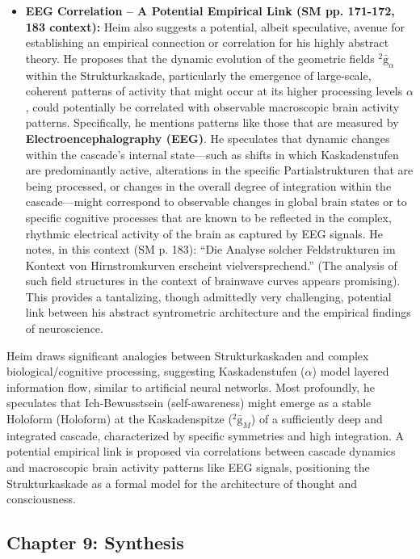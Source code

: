 \documentclass[12pt]{article}
\newcommand{\q}[1]{\enquote{#1}}
\newcommand{\holoform}{\text{Holoform}}
\newcommand{\kompositionsfeld}{{}^2\bar{\mathrm{g}}}
\newcommand{\kaskadenstufe}{\alpha}
\begin{document}
\begin{itemize}
    \item \textbf{EEG Correlation – A Potential Empirical Link (SM pp. 171-172, 183 context):}
    Heim also suggests a potential, albeit speculative, avenue for establishing an empirical connection or correlation for his highly abstract theory. He proposes that the dynamic evolution of the geometric fields \( \kompositionsfeld_\alpha \) within the Strukturkaskade, particularly the emergence of large-scale, coherent patterns of activity that might occur at its higher processing levels \( \kaskadenstufe \), could potentially be correlated with observable macroscopic brain activity patterns. Specifically, he mentions patterns like those that are measured by \textbf{Electroencephalography (EEG)}. He speculates that dynamic changes within the cascade's internal state—such as shifts in which Kaskadenstufen are predominantly active, alterations in the specific Partialstrukturen that are being processed, or changes in the overall degree of integration within the cascade—might correspond to observable changes in global brain states or to specific cognitive processes that are known to be reflected in the complex, rhythmic electrical activity of the brain as captured by EEG signals. He notes, in this context (SM p. 183): \q{Die Analyse solcher Feldstrukturen im Kontext von Hirnstromkurven erscheint vielversprechend.} (The analysis of such field structures in the context of brainwave curves appears promising). This provides a tantalizing, though admittedly very challenging, potential link between his abstract syntrometric architecture and the empirical findings of neuroscience.
\end{itemize}

Heim draws significant analogies between Strukturkaskaden and complex biological/cognitive processing, suggesting Kaskadenstufen (\(\kaskadenstufe\)) model layered information flow, similar to artificial neural networks. Most profoundly, he speculates that Ich-Bewusstsein (self-awareness) might emerge as a stable Holoform (\(\holoform\)) at the Kaskadenspitze (\(\kompositionsfeld_M\)) of a sufficiently deep and integrated cascade, characterized by specific symmetries and high integration. A potential empirical link is proposed via correlations between cascade dynamics and macroscopic brain activity patterns like EEG signals, positioning the Strukturkaskade as a formal model for the architecture of thought and consciousness.

\subsection{Chapter 9: Synthesis}
\label{sec:chapter9_synthesis}
\end{document}
